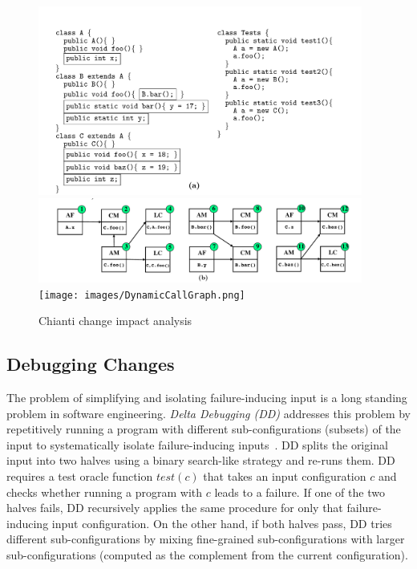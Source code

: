 \begin{figure}
\centering
\includegraphics[width=0.95\textwidth]{images/ChiantiExample.pdf}
\includegraphics[width=0.95\textwidth]{images/ChiantiAtomicChange.pdf}
\texttt{[image: images/DynamicCallGraph.png]}
\caption{Chianti change impact analysis} 
\label{fig:chianti} 
\end{figure}

\subsection{Debugging Changes} 
\label{sec:deltadebugging} 
The problem of simplifying and isolating failure-inducing input is a long standing problem in software engineering. {\it Delta Debugging (DD)} addresses this problem by repetitively running a program with different sub-configurations (subsets) of the input to systematically isolate failure-inducing inputs~\cite{Zeller1999, zeller01}. DD splits the original input into two halves using a binary search-like strategy and re-runs them.  DD requires a test oracle function $test(c)$ that takes an input configuration $c$ and checks whether running a program with $c$ leads to a failure.  If one of the two halves fails, DD recursively applies the same procedure for only that failure-inducing input configuration. On the other hand, if both halves pass, DD tries different sub-configurations by mixing fine-grained sub-configurations with larger sub-configurations (computed as the complement from the current configuration). 

